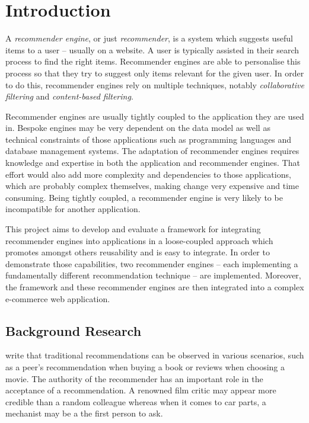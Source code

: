 \chapter{Introduction}

A \emph{recommender engine}, or just \emph{recommender}, is a system which suggests useful items to a user -- usually on a website. A user is typically assisted in their search process to find the right items. Recommender engines are able to personalise this process so that they try to suggest only items relevant for the given user. In order to do this, recommender engines rely on multiple techniques, notably \emph{collaborative filtering} and \emph{content-based filtering}.

Recommender engines are usually tightly coupled to the application they are used in. Bespoke  engines may be very dependent on the data model as well as technical constraints of those applications such as programming languages and database management systems. The adaptation of recommender engines requires knowledge and expertise in both the application and recommender engines. That effort would also add more complexity and dependencies to those applications, which are probably complex themselves, making change very expensive and time consuming. Being tightly coupled, a recommender engine is very likely to be incompatible for another application.

This project aims to develop and evaluate a framework for integrating recommender engines into applications in a loose-coupled approach which promotes amongst others reusability and is easy to integrate. In order to demonstrate those capabilities, two recommender engines -- each implementing a fundamentally different recommendation technique -- are implemented. Moreover, the framework and these recommender engines are then integrated into a complex e-commerce web application.

\section{Background Research}

\citet{ricci11} write that traditional recommendations can be observed in various scenarios, such as a peer's recommendation when buying a book or reviews when choosing a movie. The authority of the recommender has an important role in the acceptance of a recommendation. A renowned film critic may appear more credible than a random colleague whereas when it comes to car parts, a mechanist may be a the first person to ask.

